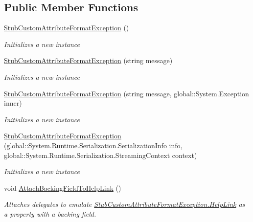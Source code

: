 \subsection*{Public Member Functions}
\begin{DoxyCompactItemize}
\item 
\hyperlink{class_system_1_1_reflection_1_1_fakes_1_1_stub_custom_attribute_format_exception_a0514373a24c5abc6e51e750d0a30b85b}{Stub\-Custom\-Attribute\-Format\-Exception} ()
\begin{DoxyCompactList}\small\item\em Initializes a new instance\end{DoxyCompactList}\item 
\hyperlink{class_system_1_1_reflection_1_1_fakes_1_1_stub_custom_attribute_format_exception_a2b75c41e775ecd6037e2a8b4b9b28c96}{Stub\-Custom\-Attribute\-Format\-Exception} (string message)
\begin{DoxyCompactList}\small\item\em Initializes a new instance\end{DoxyCompactList}\item 
\hyperlink{class_system_1_1_reflection_1_1_fakes_1_1_stub_custom_attribute_format_exception_a9a13d3384fe3f7e12248caa6d1e977ae}{Stub\-Custom\-Attribute\-Format\-Exception} (string message, global\-::\-System.\-Exception inner)
\begin{DoxyCompactList}\small\item\em Initializes a new instance\end{DoxyCompactList}\item 
\hyperlink{class_system_1_1_reflection_1_1_fakes_1_1_stub_custom_attribute_format_exception_a5691008943f70520ded9af9022fe790e}{Stub\-Custom\-Attribute\-Format\-Exception} (global\-::\-System.\-Runtime.\-Serialization.\-Serialization\-Info info, global\-::\-System.\-Runtime.\-Serialization.\-Streaming\-Context context)
\begin{DoxyCompactList}\small\item\em Initializes a new instance\end{DoxyCompactList}\item 
void \hyperlink{class_system_1_1_reflection_1_1_fakes_1_1_stub_custom_attribute_format_exception_ab78e2e50761c2d7f38ba2537f35368ac}{Attach\-Backing\-Field\-To\-Help\-Link} ()
\begin{DoxyCompactList}\small\item\em Attaches delegates to emulate \hyperlink{class_system_1_1_reflection_1_1_fakes_1_1_stub_custom_attribute_format_exception_a951a8cfba8cb7a65a3e2319c57928692}{Stub\-Custom\-Attribute\-Format\-Exception.\-Help\-Link} as a property with a backing field.\end{DoxyCompactList}\item 

\end{DoxyCompactItemize}
